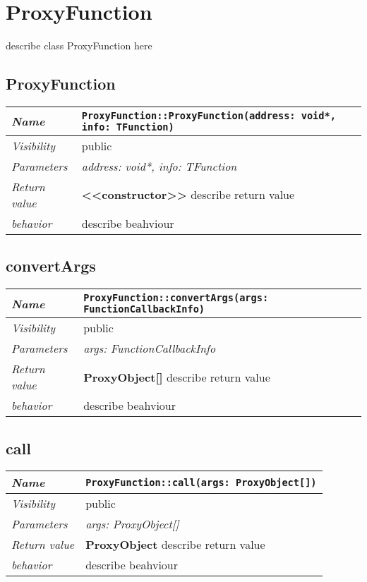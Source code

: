\chapter{ProxyFunction}
describe class ProxyFunction here
\section{ProxyFunction}
\begin{longtable}{p{3cm} @{\hskip 1cm} p{12cm}}
 \hline
\textit{Name} & \texttt{ProxyFunction::ProxyFunction(address: void*, info: TFunction)}\\
\hline
 \textit{Visibility} & public\\
\hline
\textit{Parameters} & \textit{address: void*, info: TFunction}\\
\hline
\textit{Return value} & \textbf{ <<constructor>>} describe return value\\
  \hline
 \textit{behavior} & describe beahviour \\
\hline
\end{longtable} \pagebreak
 \section{convertArgs}
\begin{longtable}{p{3cm} @{\hskip 1cm} p{12cm}}
 \hline
\textit{Name} & \texttt{ProxyFunction::convertArgs(args: FunctionCallbackInfo)}\\
\hline
 \textit{Visibility} & public\\
\hline
\textit{Parameters} & \textit{args: FunctionCallbackInfo}\\
\hline
\textit{Return value} & \textbf{ ProxyObject[]} describe return value\\
  \hline
 \textit{behavior} & describe beahviour \\
\hline
\end{longtable} \pagebreak
 \section{call}
\begin{longtable}{p{3cm} @{\hskip 1cm} p{12cm}}
 \hline
\textit{Name} & \texttt{ProxyFunction::call(args: ProxyObject[])}\\
\hline
 \textit{Visibility} & public\\
\hline
\textit{Parameters} & \textit{args: ProxyObject[]}\\
\hline
\textit{Return value} & \textbf{ ProxyObject} describe return value\\
  \hline
 \textit{behavior} & describe beahviour \\
\hline
\end{longtable} \pagebreak
